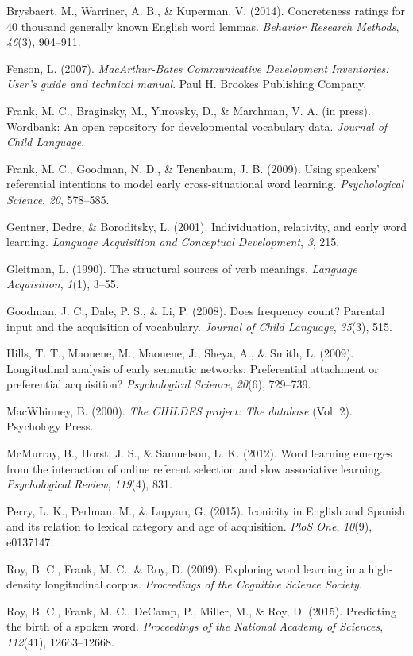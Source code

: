 \documentclass[10pt, letterpaper]{article}
\begin{document}
Brysbaert, M., Warriner, A. B., \& Kuperman, V. (2014). Concreteness
ratings for 40 thousand generally known English word lemmas.
\emph{Behavior Research Methods}, \emph{46}(3), 904--911.

Fenson, L. (2007). \emph{MacArthur-Bates Communicative Development
Inventories: User's guide and technical manual}. Paul H. Brookes
Publishing Company.

Frank, M. C., Braginsky, M., Yurovsky, D., \& Marchman, V. A. (in
press). Wordbank: An open repository for developmental vocabulary data.
\emph{Journal of Child Language}.

Frank, M. C., Goodman, N. D., \& Tenenbaum, J. B. (2009). Using
speakers' referential intentions to model early cross-situational word
learning. \emph{Psychological Science}, \emph{20}, 578--585.

Gentner, Dedre, \& Boroditsky, L. (2001). Individuation, relativity, and
early word learning. \emph{Language Acquisition and Conceptual
Development}, \emph{3}, 215.

Gleitman, L. (1990). The structural sources of verb meanings.
\emph{Language Acquisition}, \emph{1}(1), 3--55.

Goodman, J. C., Dale, P. S., \& Li, P. (2008). Does frequency count?
Parental input and the acquisition of vocabulary. \emph{Journal of Child
Language}, \emph{35}(3), 515.

Hills, T. T., Maouene, M., Maouene, J., Sheya, A., \& Smith, L. (2009).
Longitudinal analysis of early semantic networks: Preferential
attachment or preferential acquisition? \emph{Psychological Science},
\emph{20}(6), 729--739.

MacWhinney, B. (2000). \emph{The CHILDES project: The database} (Vol.
2). Psychology Press.

McMurray, B., Horst, J. S., \& Samuelson, L. K. (2012). Word learning
emerges from the interaction of online referent selection and slow
associative learning. \emph{Psychological Review}, \emph{119}(4), 831.

Perry, L. K., Perlman, M., \& Lupyan, G. (2015). Iconicity in English
and Spanish and its relation to lexical category and age of acquisition.
\emph{PloS One}, \emph{10}(9), e0137147.

Roy, B. C., Frank, M. C., \& Roy, D. (2009). Exploring word learning in
a high-density longitudinal corpus. \emph{Proceedings of the Cognitive
Science Society}.

Roy, B. C., Frank, M. C., DeCamp, P., Miller, M., \& Roy, D. (2015).
Predicting the birth of a spoken word. \emph{Proceedings of the National
Academy of Sciences}, \emph{112}(41), 12663--12668.
\end{document}
